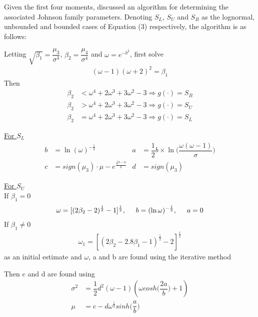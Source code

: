 \documentclass[paper=a4, fontsize=11pt]{scrartcl}
\begin{document}
Given the first four moments, \cite{hill1976} discussed an algorithm for determining the associated Johnson family parameters.
Denoting $S_L$, $S_U$ and $S_B$ as the lognormal, unbounded and bounded cases of Equation (3) respectively, the algorithm is as follows:

Letting $\sqrt{\beta_1} = \dfrac{\mu_3}{\sigma^3}$, $\beta_2 = \dfrac{\mu_4}{\sigma^4}$ and $\omega = e^{-b^2}$, first solve
\begin{align}
(\omega - 1)(\omega + 2)^2 = \beta_1 \nonumber
\end{align}
Then
\begin{align}
\beta_2 &< \omega^4 + 2\omega^3 + 3\omega^2 - 3 \Longrightarrow g(\cdot) = S_B \nonumber \\
\beta_2 &> \omega^4 + 2\omega^3 + 3\omega^2 - 3 \Longrightarrow g(\cdot) = S_U \nonumber \\
\beta_2 &= \omega^4 + 2\omega^3 + 3\omega^2 - 3 \Longrightarrow g(\cdot) = S_L \nonumber
\end{align}

\underline{For $S_L$}
\begin{align}
b &= \ln(\omega)^{-{\frac{1}{2}}} &a& = \dfrac{1}{2}b\times \ln\Big(\dfrac{\omega (\omega -1)}{\sigma}\Big) \nonumber \\
c &= sign(\mu_3)\cdot\mu - e^{\frac{\frac{1}{2}b - a}{b}} &d& = sign(\mu_3) \nonumber
\end{align}

\underline{For $S_U$}\\

If $\beta_1 = 0$
\begin{align}
\omega = [(2\beta_2 - 2 )^{\frac{1}{2}} - 1]^{\frac{1}{2}}, \hspace*{5mm} b = (\ln\omega)^{-\frac{1}{2}}, \hspace*{5mm} a = 0 \nonumber
\end{align}
If $\beta_1 \neq 0$
\begin{align}
\omega_1 = [(2\beta_2 - 2.8\beta_1 - 1)^{\frac{1}{2}} - 2]^{\frac{1}{2}} \nonumber
\end{align}
as an initial estimate and $\omega$, a and b are found using the \citet{johnson1969} iterative method 

Then c and d are found using
\begin{align}
\sigma^2 &= \dfrac{1}{2}d^2(\omega - 1)(\omega cosh\Big(\dfrac{2a}{b}\Big) + 1) \nonumber \\
\mu 	 &= c - d\omega^{\frac{1}{2}}sinh\Big(\dfrac{a}{b}\Big) \nonumber
\end{align}
\end{document}
